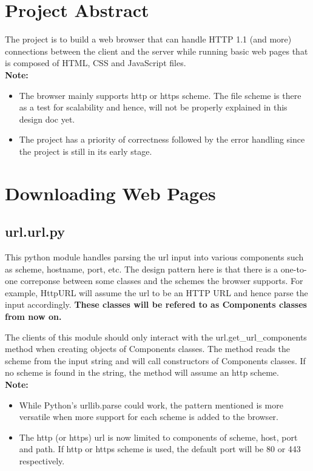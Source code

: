 \documentclass[11pt]{article}
\begin{document}

\section{Project Abstract}

The project is to build a web browser that can handle HTTP 1.1 (and more) connections between the client and the server while running basic web pages that is composed of HTML, CSS and JavaScript files.
\\

\noindent \textbf{Note:}
\begin{itemize}
    \item The browser mainly supports http or https scheme. The file scheme is there as a test for scalability and hence,
    will not be properly explained in this design doc yet.
    \item The project has a priority of correctness followed by the error handling since the project is still in its early stage.
\end{itemize}

\section{Downloading Web Pages}

\subsection{url.url.py}

This python module handles parsing the url input into various components such as scheme, hostname, port, etc. The design pattern 
here is that there is a one-to-one correponse between some classes and the schemes the browser supports. For example, {\color{blue}HttpURL} will assume 
the url to be an HTTP URL and hence parse the input accordingly. \textbf{These classes will be refered to as Components classes from now on.}

The clients of this module should only interact with the {\color{blue}url.get\_url\_components} method when creating objects of Components classes.
The method reads the scheme from the input string and will call constructors of Components classes. If no scheme is found in the string, the method will
assume an http scheme. \\

\noindent \textbf{Note:} 
\begin{itemize}
    \item While Python's {\color{blue}urllib.parse} could work, the pattern mentioned is more versatile when more support for each scheme is added to the browser.
    \item The http (or https) url is now limited to components of scheme, host, port and path. If http or https scheme is used, the default port will be 80 or 443 respectively.
\end{itemize}
\end{document}
